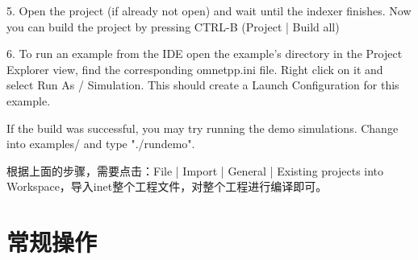 \begin{itemize}
\begin{definition}
	5. Open the project (if already not open) and wait until the indexer finishes.
	Now you can build the project by pressing CTRL-B (Project | Build all)
	
	6. To run an example from the IDE open the example's directory in the Project Explorer view,
	find the corresponding omnetpp.ini file. Right click on it and select Run As / Simulation.
	This should create a Launch Configuration for this example.
	
	If the build was successful, you may try running the demo simulations.
	Change into examples/ and type "./rundemo".
\end{definition}
根据上面的步骤，需要点击：File | Import | General | Existing projects into Workspace，导入inet整个工程文件，对整个工程进行编译即可。\\
	
\end{itemize}


\section{常规操作}





